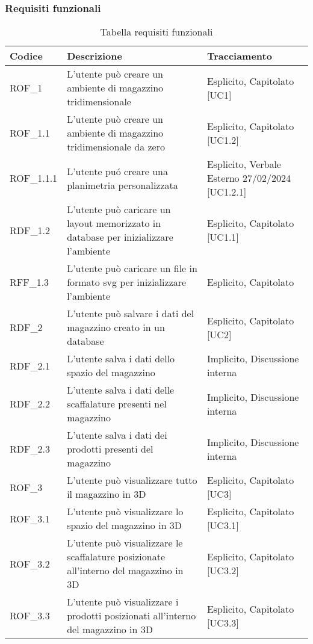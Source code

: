 \subsubsection{Requisiti funzionali}\label{subsec:requisiti_funzionali}
\renewcommand{\arraystretch}{2.5}
\begin{xltabular}{\textwidth}{ p{0.1\textwidth} | X | p{0.3\textwidth} }
    \textbf{\color{white} Codice} & \textbf{\color{white} Descrizione} & \textbf{\color{white} Tracciamento} \\ 
    \endhead

    \caption{Tabella requisiti funzionali} 
    \endlastfoot

    ROF\_1 & L'utente può creare un ambiente di magazzino tridimensionale & Esplicito, Capitolato [UC1]\\
    ROF\_1.1 & L'utente può creare un ambiente di magazzino tridimensionale da zero & Esplicito, Capitolato [UC1.2]\\
    ROF\_1.1.1 & L'utente puó creare una planimetria personalizzata & Esplicito, Verbale Esterno 27/02/2024 [UC1.2.1]\\
    RDF\_1.2 & L'utente può caricare un layout memorizzato in database per inizializzare l'ambiente & Esplicito, Capitolato [UC1.1]\\
    RFF\_1.3 & L'utente può caricare un file in formato svg per inizializzare l'ambiente & Esplicito, Capitolato \\
    RDF\_2 & L'utente può salvare i dati del magazzino creato in un database & Esplicito, Capitolato [UC2]\\  
    RDF\_2.1 & L'utente salva i dati dello spazio del magazzino & Implicito, Discussione interna \\  
    RDF\_2.2 & L'utente salva i dati delle scaffalature presenti nel magazzino & Implicito, Discussione interna \\  
    RDF\_2.3 & L'utente salva i dati dei prodotti presenti del magazzino & Implicito, Discussione interna \\    
    ROF\_3 & L'utente può visualizzare tutto il magazzino in 3D & Esplicito, Capitolato [UC3]\\
    ROF\_3.1 & L'utente può visualizzare lo spazio del magazzino in 3D & Esplicito, Capitolato [UC3.1]\\
    ROF\_3.2 & L'utente può visualizzare le scaffalature posizionate all'interno del magazzino in 3D & Esplicito, Capitolato [UC3.2]\\
    ROF\_3.3 & L'utente può visualizzare i prodotti posizionati all'interno del magazzino in 3D & Esplicito, Capitolato [UC3.3]\\

\end{xltabular}
